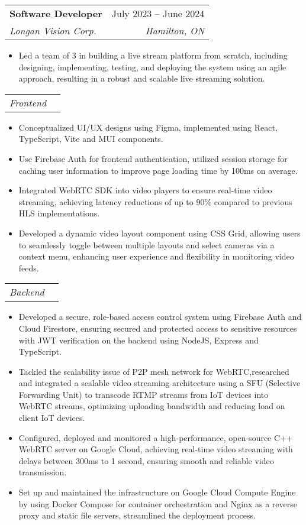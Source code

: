 \documentclass[letterpaper,11pt]{article}
\makeatletter
\newcommand{\resumeItem}[1]{
  \item\small{
    {#1 \vspace{-2pt}}
  }
}
\newcommand{\resumeSubheading}[4]{
  \vspace{-2pt}\item
    \begin{tabular*}{0.97\textwidth}[t]{l@{\extracolsep{\fill}}r}
      \textbf{#1} & #2 \\
      \textit{\small#3} & \textit{\small #4} \\
    \end{tabular*}\vspace{-7pt}
}
\newcommand{\resumeSubSubheading}[2]{
    \item
    \begin{tabular*}{0.97\textwidth}{l@{\extracolsep{\fill}}r}
      \textit{\small#1} & \textit{\small #2} \\
    \end{tabular*}\vspace{-7pt}
}
\newcommand{\resumeSubItem}[1]{
  \begin{itemize}[leftmargin=0.2in, label=\textbullet]
    \item\small{
      {#1 \vspace{-2pt}}
    }
  \end{itemize}
}
\newcommand{\resumeItemListStart}{\begin{itemize}}
\newcommand{\resumeItemListEnd}{\end{itemize}\vspace{-5pt}}
\makeatother
\begin{document}
    \resumeSubheading
      {Software Developer}{July 2023 -- June 2024}
      {Longan Vision Corp.}{Hamilton, ON}
        \resumeItemListStart
          \resumeItem{Led a team of 3 in building a live stream platform from scratch, including designing, implementing, testing, and deploying the system using an agile approach, resulting in a robust and scalable live streaming solution.}
        \resumeItemListEnd
      \resumeSubSubheading{Frontend}{}
        \resumeItemListStart
          \resumeItem{Conceptualized UI/UX designs using Figma, implemented using React,  TypeScript, Vite and MUI components.}
          \resumeItem{Use Firebase Auth for frontend authentication, utilized session storage for caching user information to improve page loading time by 100ms on average.}
          \resumeItem{Integrated WebRTC SDK into video players to ensure real-time video streaming, achieving latency reductions of up to 90\% compared to previous HLS implementations.}
          \resumeItem{Developed a dynamic video layout component using CSS Grid, allowing users to   seamlessly toggle between multiple layouts and select cameras via a context menu, enhancing user experience and flexibility in monitoring video feeds.}
        \resumeItemListEnd
      \resumeSubSubheading{Backend}{}
      \resumeItemListStart
          \resumeItem{Developed a secure, role-based access control system using Firebase Auth and Cloud Firestore, ensuring secured and protected access to sensitive resources with JWT verification on the backend using NodeJS, Express and TypeScript.}
          \resumeItem{Tackled the scalability issue of P2P mesh network for WebRTC,researched and integrated a scalable video streaming architecture using a SFU (Selective Forwarding Unit) to transcode RTMP streams from IoT devices into WebRTC streams, optimizing uploading bandwidth and reducing load on client IoT devices.}
          \resumeItem{Configured, deployed and monitored a high-performance, open-source C++ WebRTC server on Google Cloud, achieving real-time video streaming with delays between 300ms to 1 second, ensuring smooth and reliable video transmission.}
          \resumeItem{Set up and maintained the infrastructure on Google Cloud Compute Engine by using Docker Compose for container orchestration and Nginx as a reverse proxy and static file servers, streamlined the deployment process.}
        \resumeItemListEnd
  
\end{document}
